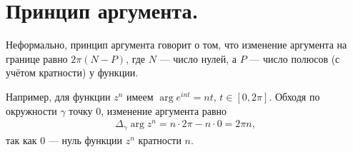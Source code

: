 \documentclass[../complex-analysis.tex]{subfiles}
\begin{document}
 
\newpage
\section{Принцип аргумента.}

Неформально, принцип аргумента говорит о том, что изменение аргумента на границе равно $ 2\pi(N - P) $, где $ N $ --- число нулей, а $ P $ --- число полюсов (с учётом кратности) у функции.

Например, для функции $ z^{n} $ имеем $ \arg e^{int} = nt $, $ t \in [0,2\pi] $. Обходя по окружности $ \gamma $ точку $ 0 $, изменение аргумента равно
\begin{align*}
 \Delta_\gamma \arg z^{n} = n \cdot 2\pi - n \cdot 0 = 2\pi n,
\end{align*} так как $ 0 $ --- нуль функции $ z^{n} $ кратности $ n $.
\end{document}

